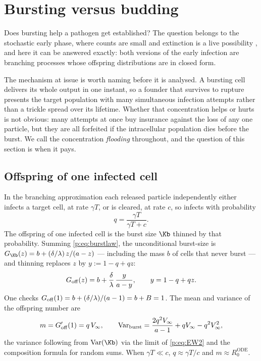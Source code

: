 
\section{Bursting versus budding}
\label{p:sec:flooding}

Does bursting help a pathogen get established? The question belongs to the
stochastic early phase, where counts are small and extinction is a live
possibility \cite{pearson2011stochastic}, and here it can be answered
exactly:
both versions of the early infection are branching processes whose offspring
distributions are in closed form.

The mechanism at issue is worth naming before it is analysed. A bursting
cell delivers its whole output in one instant, so a founder that survives to
rupture presents the target population with many simultaneous infection
attempts rather than a trickle spread over its lifetime. Whether that
concentration helps or hurts is not obvious: many attempts at once buy
insurance against the loss of any one particle, but they are all forfeited
if the intracellular population dies before the burst. We call the
concentration \emph{flooding} throughout, and the question of this section
is when it pays.

\subsection{Offspring of one infected cell}

In the branching approximation each released particle independently either
infects a target cell, at rate $\gamma T$, or is cleared, at rate $c$, so
infects with probability
\begin{equation}
q=\frac{\gamma T}{\gamma T+c}.
\label{p:eq:q}
\end{equation}
The offspring of one infected cell is the burst size $\Kb$ thinned by that
probability. Summing \cref{p:eq:burstlaw}, the unconditional burst-size
\pgf{} is
$G_{\Kb}(z)=b+(\delta/\lambda)\,z/(a-z)$ --- including the mass $b$ of cells
that never burst --- and thinning replaces $z$ by $y:=1-q+qz$:
\begin{equation}
G_{\rm off}(z)=b+\frac{\delta}{\lambda}\,\frac{y}{a-y},
\qquad y=1-q+qz.
\label{p:eq:Goff}
\end{equation}
One checks $G_{\rm off}(1)=b+(\delta/\lambda)/(a-1)=b+B=1$. The mean and
variance of the offspring number are
\begin{equation}
m=G_{\rm off}'(1)=q\,V_\infty,
\qquad
\mathrm{Var}_{\rm burst}
=\frac{2q^2V_\infty}{a-1}+qV_\infty-q^2V_\infty^2,
\label{p:eq:offmoments}
\end{equation}
the variance following from $\mathrm{Var}(\Kb)$ via the limit of
\cref{p:eq:EW2} and the composition formula for random sums. When $\gamma
T\ll c$, $q\approx\gamma T/c$ and $m\approx R_0^{\mathrm{ODE}}$.

